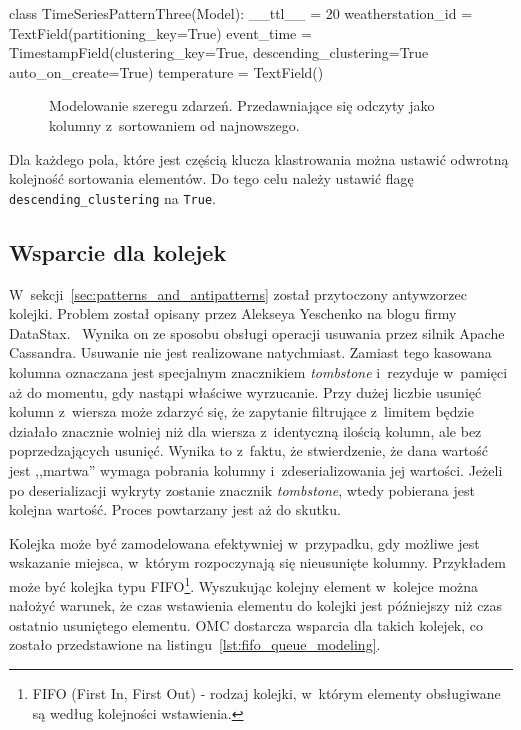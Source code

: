 \begin{verbbox}
class TimeSeriesPatternThree(Model):
    __ttl__ = 20
    weatherstation_id = TextField(partitioning_key=True)
    event_time = TimestampField(clustering_key=True, 
                                descending_clustering=True
                                auto_on_create=True)
    temperature = TextField()
\end{verbbox}

\begin{figure}[ht!]
	\centering
	\theverbbox
	\caption{Modelowanie szeregu zdarzeń. Przedawniające się odczyty jako kolumny z~sortowaniem od najnowszego.}
	\label{lst:time_series_modeling_three}
\end{figure} 

Dla każdego pola, które jest częścią klucza klastrowania można ustawić odwrotną kolejność sortowania elementów. Do tego celu należy ustawić flagę \verb+descending_clustering+ na \verb+True+.

\subsection{Wsparcie dla kolejek}

W~sekcji~\ref{sec:patterns_and_antipatterns} został przytoczony antywzorzec kolejki. Problem został opisany przez Alekseya Yeschenko na blogu firmy DataStax.~\cite{cassandra_queue_antipattern} Wynika on ze sposobu obsługi operacji usuwania przez silnik Apache Cassandra. Usuwanie nie jest realizowane natychmiast. Zamiast tego kasowana kolumna oznaczana jest specjalnym znacznikiem \emph{tombstone} i~rezyduje w~pamięci aż do momentu, gdy nastąpi właściwe wyrzucanie. Przy dużej liczbie usunięć kolumn z~wiersza może zdarzyć się, że zapytanie filtrujące z~limitem będzie działało znacznie wolniej niż dla wiersza z~identyczną ilością kolumn, ale bez poprzedzających usunięć. Wynika to z~faktu, że stwierdzenie, że dana wartość jest ,,martwa'' wymaga pobrania kolumny i~zdeserializowania jej wartości. Jeżeli po deserializacji wykryty zostanie znacznik \emph{tombstone}, wtedy pobierana jest kolejna wartość. Proces powtarzany jest aż do skutku.

Kolejka może być zamodelowana efektywniej w~przypadku, gdy możliwe jest wskazanie miejsca, w~którym rozpoczynają się nieusunięte kolumny. Przykładem może być kolejka typu FIFO\footnote{FIFO (First In, First Out) - rodzaj kolejki, w~którym elementy obsługiwane są według kolejności wstawienia.}. Wyszukując kolejny element w~kolejce można nałożyć warunek, że czas wstawienia elementu do kolejki jest późniejszy niż czas ostatnio usuniętego elementu. OMC dostarcza wsparcia dla takich kolejek, co zostało przedstawione na listingu~\ref{lst:fifo_queue_modeling}.

